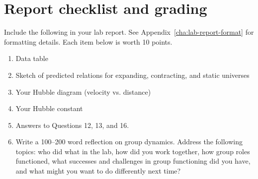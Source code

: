 \section{Report checklist and grading}

Include the following in your lab report. See Appendix~\ref{cha:lab-report-format} for formatting details. Each item below is worth 10 points.

\begin{enumerate}
	\item Data table
	
	\item Sketch of predicted relations for expanding, contracting, and static universes
	
	\item Your Hubble diagram (velocity vs. distance)
	
	\item Your Hubble constant
	
	\item Answers to Questions 12, 13, and 16.
	
	\item Write a 100--200 word reflection on group dynamics. Address the following topics: who did what in the lab, how did you work together, how group roles functioned, what successes and challenges in group functioning did you have, and what might you want to do differently next time?
\end{enumerate}